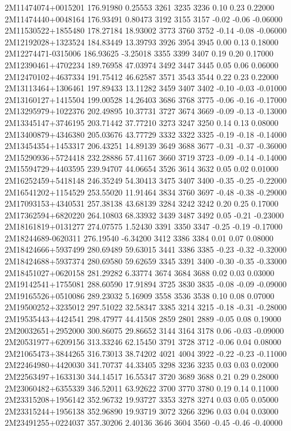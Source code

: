 2M11474074+0015201 176.91980   0.25553 3261 3235 3236  0.10  0.23  0.22000 
2M11474440+0048164 176.93491   0.80473 3192 3155 3157 -0.02 -0.06 -0.06000 
2M11530522+1855480 178.27184  18.93002 3773 3760 3752 -0.14 -0.08 -0.06000 
2M12192028+1323524 184.83449  13.39793 3926 3954 3945  0.00  0.13  0.18000 
2M12274471-0315006 186.93625  -3.25018 3355 3399 3407  0.19  0.20  0.17000 
2M12390461+4702234 189.76958  47.03974 3492 3447 3445  0.05  0.06  0.06000 
2M12470102+4637334 191.75412  46.62587 3571 3543 3544  0.22  0.23  0.22000 
2M13113464+1306461 197.89433  13.11282 3459 3407 3402 -0.10 -0.03 -0.01000 
2M13160127+1415504 199.00528  14.26403 3686 3768 3775 -0.06 -0.16 -0.17000 
2M13295979+1022376 202.49895  10.37731 3727 3674 3669 -0.09 -0.13 -0.13000 
2M13345147+3746195 203.71442  37.77210 3273 3247 3250  0.14  0.13  0.08000 
2M13400879+4346380 205.03676  43.77729 3332 3322 3325 -0.19 -0.18 -0.14000 
2M13454354+1453317 206.43251  14.89139 3649 3688 3677 -0.31 -0.37 -0.36000 
2M15290936+5724418 232.28886  57.41167 3660 3719 3723 -0.09 -0.14 -0.14000 
2M15594729+4403595 239.94707  44.06654 3526 3614 3632  0.05  0.02  0.01000 
2M16252459+5418148 246.35249  54.30413 3475 3407 3400 -0.35 -0.25 -0.22000 
2M16541202+1154529 253.55020  11.91464 3834 3760 3697 -0.48 -0.38 -0.29000 
2M17093153+4340531 257.38138  43.68139 3284 3242 3242  0.20  0.25  0.17000 
2M17362594+6820220 264.10803  68.33932 3439 3487 3492  0.05 -0.21 -0.23000 
2M18161819+0131277 274.07575   1.52430 3391 3350 3347 -0.25 -0.19 -0.17000 
2M18244689-0620311 276.19540  -6.34200 3412 3386 3384  0.01  0.07  0.08000 
2M18424666+5937499 280.69489  59.63015 3441 3386 3385 -0.23 -0.32 -0.32000 
2M18424688+5937374 280.69580  59.62659 3345 3391 3400 -0.30 -0.35 -0.33000 
2M18451027+0620158 281.29282   6.33774 3674 3684 3688  0.02  0.03  0.03000 
2M19142541+1755081 288.60590  17.91894 3725 3830 3835 -0.08 -0.09 -0.09000 
2M19165526+0510086 289.23032   5.16909 3558 3536 3538  0.10  0.08  0.07000 
2M19500252+3235012 297.51022  32.58347 3385 3214 3215 -0.18 -0.31 -0.28000 
2M19535443+4424541 298.47977  44.41508 2859 2801 2889 -0.05  0.08  0.19000 
2M20032651+2952000 300.86075  29.86652 3144 3164 3178  0.06 -0.03 -0.09000 
2M20531977+6209156 313.33246  62.15450 3791 3728 3712 -0.06  0.04  0.08000 
2M21065473+3844265 316.73013  38.74202 4021 4004 3922 -0.22 -0.23 -0.11000 
2M22464980+4420030 341.70737  44.33405 3298 3236 3235  0.03  0.03  0.02000 
2M22563497+1633130 344.14517  16.55347 3720 3689 3688  0.21  0.29  0.28000 
2M23060482+6355339 346.52011  63.92622 3700 3770 3780  0.19  0.14  0.11000 
2M23315208+1956142 352.96732  19.93727 3353 3278 3274  0.03  0.05  0.05000 
2M23315244+1956138 352.96890  19.93719 3072 3266 3296  0.03  0.04  0.03000 
2M23491255+0224037 357.30206   2.40136 3646 3604 3560 -0.45 -0.46 -0.40000 